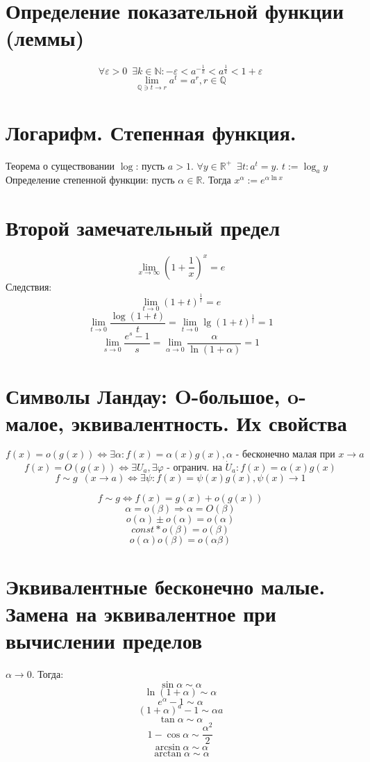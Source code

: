 \documentclass[11pt, a4paper]{article}
\def\R{\mathbb{R}}
\def\Q{\mathbb{Q}}
\def\N{\mathbb{N}}
\def\sp{\, \, \,}
\begin{document}
    \section{Определение показательной функции (леммы)}
    $$\forall \varepsilon > 0 \sp \exists k \in \N : -\varepsilon < a^{-\frac{1}{k}} < a^{\frac{1}{k}} < 1 + \varepsilon$$
    $$\lim_{\Q \ni t \to r} a^t = a^r , r \in \Q$$

    \section{Логарифм. Степенная функция.}
    Теорема о существовании $\log$: пусть $a > 1$. $\forall y \in \R^+ \sp \exists t: a^t = y$. $t := \log_a y$\\
    Определение степенной функции: пусть $\alpha \in \R$. Тогда $x^{\alpha} := e^{\alpha \ln x}$

    \section{Второй замечательный предел}
    $$\lim_{x \to \infty} \left(1 + \frac{1}{x}\right)^x = e$$
    Следствия:
    $$\lim_{t \to 0} (1+t)^{\frac{1}{t}} = e$$
    $$\lim_{t \to 0} \frac{\log (1+t)}{t} = \lim_{t \to 0} \lg (1+t)^{\frac{1}{t}} = 1$$
    $$\lim_{s \to 0} \frac{e^s - 1}{s} = \lim_{\alpha \to 0} \frac{\alpha}{\ln (1 + \alpha)} = 1$$

    \section{Символы Ландау: O-большое, o-малое, эквивалентность. Их свойства}
    $$f(x) = o(g(x)) \Leftrightarrow \exists \alpha : f(x) = \alpha (x) g(x), \alpha \text{ - бесконечно малая при } x \to a$$
    $$f(x) = O(g(x)) \Leftrightarrow \exists U_a, \exists \varphi \text{ - огранич. на } \dot{U}_a : f(x) = \alpha (x) g(x)$$
    $$f \sim g \sp (x \to a) \Leftrightarrow \exists \psi : f(x) = \psi (x) g(x), \psi (x) \to 1$$

    $$f \sim g \Leftrightarrow f(x) = g(x) + o(g(x))$$
    $$\alpha = o(\beta) \Rightarrow \alpha = O(\beta)$$
    $$o(\alpha) \pm o(\alpha) = o(\alpha)$$
    $$const * o(\beta) = o(\beta)$$
    $$o(\alpha)o(\beta) = o(\alpha \beta)$$
    

    \section{Эквивалентные бесконечно малые. Замена на эквивалентное при вычислении пределов}
    $\alpha \to 0$. Тогда:
    $$\sin \alpha \sim \alpha$$
    $$\ln (1 + \alpha) \sim \alpha$$
    $$e^{\alpha} - 1 \sim \alpha$$
    $$(1 + \alpha)^a - 1 \sim \alpha a$$
    $$\tan \alpha \sim \alpha$$
    $$1 - \cos \alpha \sim \frac{\alpha ^2}{2}$$
    $$\arcsin \alpha \sim \alpha$$
    $$\arctan \alpha \sim \alpha$$
\end{document}
